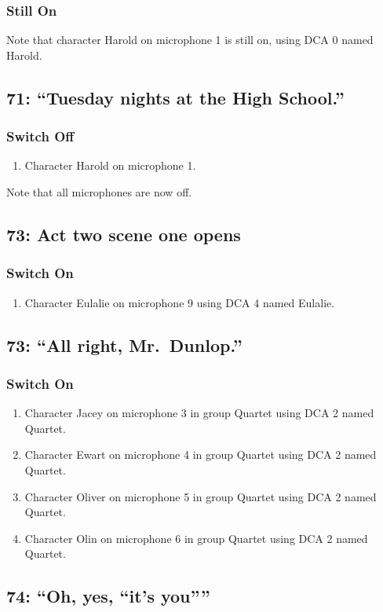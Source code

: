 \subsubsection* {Still On}
Note that character Harold on microphone 1 is still on, using DCA 0 named Harold.\subsection* {71: ``Tuesday nights at the High School.''}
\subsubsection* {Switch Off}
\begin{enumerate}
\item Character Harold on microphone 1.
\end{enumerate}
Note that all microphones are now off.
\subsection* {73: Act two scene one opens}
\subsubsection* {Switch On}
\begin{enumerate}
\item Character Eulalie on microphone 9 using DCA 4 named Eulalie.
\end{enumerate}
\subsection* {73: ``All right, Mr.~Dunlop.''}
\subsubsection* {Switch On}
\begin{enumerate}
\item Character Jacey on microphone 3 in group Quartet using DCA 2 named Quartet.
\item Character Ewart on microphone 4 in group Quartet using DCA 2 named Quartet.
\item Character Oliver on microphone 5 in group Quartet using DCA 2 named Quartet.
\item Character Olin on microphone 6 in group Quartet using DCA 2 named Quartet.
\end{enumerate}
\subsection* {74: ``Oh, yes, ``it's you''''}
